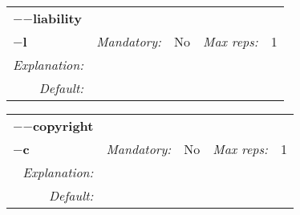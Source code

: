 \begin{center}\begin{tabular}{|rr|rl|rl|}
\hline
\multicolumn{2}{|l|}{\textbf{$-$$-$liability}} & \multicolumn{4}{|l|}{} \\
\cline{3-6}
\multicolumn{2}{|l|}{\textbf{$-$l}} & \emph{Mandatory:} & No & \emph{Max reps:} & 1 \\
\hline
\emph{Explanation:} & \multicolumn{5}{|p{12cm}|}{} \\
\hline
\emph{Default:} & \multicolumn{5}{|p{12cm}|}{} \\
\hline
\end{tabular}\end{center}
\begin{center}\begin{tabular}{|rr|rl|rl|}
\hline
\multicolumn{2}{|l|}{\textbf{$-$$-$copyright}} & \multicolumn{4}{|l|}{} \\
\cline{3-6}
\multicolumn{2}{|l|}{\textbf{$-$c}} & \emph{Mandatory:} & No & \emph{Max reps:} & 1 \\
\hline
\emph{Explanation:} & \multicolumn{5}{|p{12cm}|}{} \\
\hline
\emph{Default:} & \multicolumn{5}{|p{12cm}|}{} \\
\hline
\end{tabular}\end{center}

